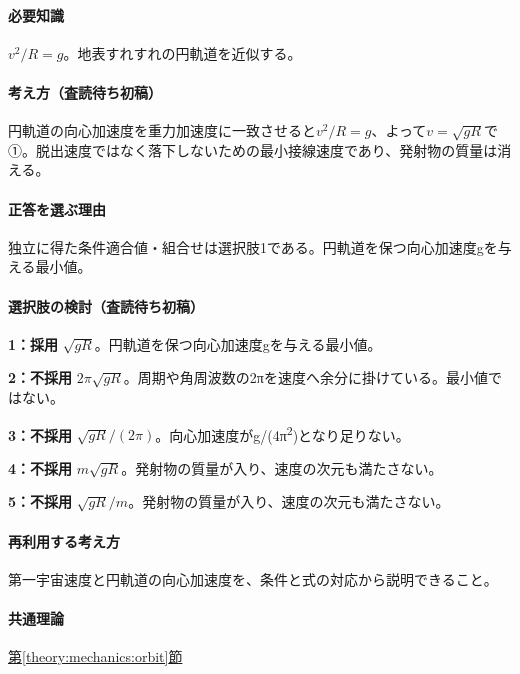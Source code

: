\paragraph{必要知識} \(v^2/R=g\)。地表すれすれの円軌道を近似する。

\paragraph{考え方（査読待ち初稿）} 円軌道の向心加速度を重力加速度に一致させると\(v^2/R=g\)、よって\(v=\sqrt{gR}\)で①。脱出速度ではなく落下しないための最小接線速度であり、発射物の質量は消える。

\paragraph{正答を選ぶ理由} 独立に得た条件適合値・組合せは選択肢1である。円軌道を保つ向心加速度gを与える最小値。

\paragraph{選択肢の検討（査読待ち初稿）}\mbox{}\par

\noindent\textbf{1：採用} \(\sqrt{gR}\)。円軌道を保つ向心加速度gを与える最小値。\par

\noindent\textbf{2：不採用} \(2\pi\sqrt{gR}\)。周期や角周波数の2πを速度へ余分に掛けている。最小値ではない。\par

\noindent\textbf{3：不採用} \(\sqrt{gR}/(2\pi)\)。向心加速度がg/(4π\textsuperscript{2})となり足りない。\par

\noindent\textbf{4：不採用} \(m\sqrt{gR}\)。発射物の質量が入り、速度の次元も満たさない。\par

\noindent\textbf{5：不採用} \(\sqrt{gR}/m\)。発射物の質量が入り、速度の次元も満たさない。\par

\paragraph{再利用する考え方} 第一宇宙速度と円軌道の向心加速度を、条件と式の対応から説明できること。

\paragraph{共通理論} \hyperref[theory:mechanics:orbit]{第\ref*{theory:mechanics:orbit}節}

